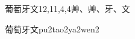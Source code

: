 \begin{entry}{葡萄牙文}{12,11,4,4}{⾋、⾋、⽛、⽂}
  \begin{phonetics}{葡萄牙文}{pu2tao2ya2wen2}
  \end{phonetics}
\end{entry}
